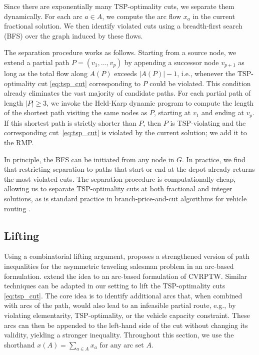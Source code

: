 \documentclass[a4paper,fleqn]{cas-dc}%
\begin{document}
Since there are exponentially many TSP-optimality cuts, we separate them dynamically. For each arc $a \in A$, we compute the arc flow $x_{a}$ in the current fractional solution. We then identify violated cuts using a breadth-first search (BFS) over the graph induced by these flows.

The separation procedure works as follows. Starting from a source node, we extend a partial path $P = (v_1, \ldots, v_p)$ by appending a successor node $v_{p+1}$ as long as the total flow along $A(P)$ exceeds $|A(P)| - 1$, i.e., whenever the TSP-optimality cut \eqref{eq:tsp_cut} corresponding to $P$ could be violated. This condition already eliminates the vast majority of candidate paths. For each partial path of length $|P| \geq 3$, we invoke the Held-Karp dynamic program \citep{held1962dynamic} to compute the length of the shortest path visiting the same nodes as $P$, starting at $v_1$ and ending at $v_p$. If this shortest path is strictly shorter than $P$, then $P$ is TSP-violating and the corresponding cut~\eqref{eq:tsp_cut} is violated by the current solution; we add it to the RMP.

In principle, the BFS can be initiated from any node in $G$. In practice, we find that restricting separation to paths that start or end at the depot already returns the most violated cuts. The separation procedure is computationally cheap, allowing us to separate TSP-optimality cuts at both fractional and integer solutions, as is standard practice in branch-price-and-cut algorithms for vehicle routing \citep{costa2019exact}.

\subsection{Lifting}
\label{subsec:lifting}

Using a combinatorial lifting argument, \citet{mak2001asymmetric} proposes a strengthened version of path inequalities for the asymmetric traveling salesman problem in an arc-based formulation. \citet{kallehauge2007path} extend the idea to an arc-based formulation of CVRPTW. Similar techniques can be adapted in our setting to lift the TSP-optimality cuts \eqref{eq:tsp_cut}. The core idea is to identify additional arcs that, when combined with arcs of the path, would also lead to an infeasible partial route, e.g., by violating elementarity, TSP-optimality, or the vehicle capacity constraint. These arcs can then be appended to the left-hand side of the cut without changing its validity, yielding a stronger inequality. Throughout this section, we use the shorthand $x(A) = \sum_{a \in A} x_a$ for any arc set $A$.
\end{document}
